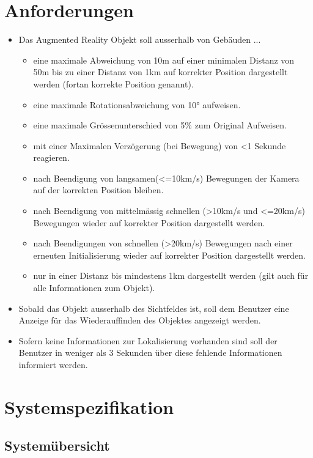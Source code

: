 \documentclass[a4paper]{scrreprt}
\begin{document}
\section{Anforderungen}
\begin{itemize}
	\item Das Augmented Reality Objekt soll ausserhalb von Gebäuden ...
	\begin{itemize}
		\item eine maximale Abweichung von 10m auf einer minimalen Distanz von 50m bis zu einer Distanz von 1km auf korrekter Position dargestellt werden (fortan korrekte Position genannt).
		\item eine maximale Rotationsabweichung von \ang{10} aufweisen.
		\item eine maximale Grössenunterschied von 5\% zum Original Aufweisen.
		\item mit einer Maximalen Verzögerung (bei Bewegung) von <1 Sekunde reagieren.
		\item nach Beendigung von langsamen(<=10km/s) Bewegungen der Kamera auf der korrekten Position bleiben.
		\item nach Beendigung von mittelmässig schnellen (>10km/s und <=20km/s) Bewegungen wieder auf korrekter Position dargestellt werden.
		\item nach Beendigungen von schnellen (>20km/s) Bewegungen nach einer erneuten Initialisierung wieder auf korrekter Position dargestellt werden.
		\item nur in einer Distanz bis mindestens 1km dargestellt werden (gilt auch für alle Informationen zum Objekt).
	\end{itemize}
	\item Sobald das Objekt ausserhalb des Sichtfeldes ist, soll dem Benutzer eine Anzeige für das Wiederauffinden des Objektes angezeigt werden.
	\item Sofern keine Informationen zur Lokalisierung vorhanden sind soll der Benutzer in weniger als 3 Sekunden über diese fehlende Informationen informiert werden.
\end{itemize}
\section{Systemspezifikation}
\label{sec:SysSpec}

\subsection{Systemübersicht}
\end{document}
